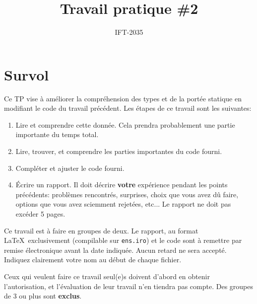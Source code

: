 \documentclass{article}
\title{Travail pratique \#2}
\author{IFT-2035}
\begin{document}
\maketitle

\newcommand \mML {\ensuremath\mu\textsl{ML}}
\newcommand \kw [1] {\textsf{#1}}
\newcommand \id [1] {\textsl{#1}}
\newcommand \punc [1] {\kw{`#1'}}
\newcommand \str [1] {\texttt{"#1"}}
\newenvironment{outitemize}{
  \begin{itemize}
  \let \origitem \item \def \item {\origitem[]\hspace{-18pt}}
}{
  \end{itemize}
}
\newcommand \MAlign [2][t] {\begin{array}[#1]{@{}l} #2 \end{array}}

\section{Survol}

Ce TP vise à améliorer la compréhension des types et de la portée statique
en modifiant le code du travail précédent.  Les étapes de ce
travail sont les suivantes:
\begin{enumerate}
\item Lire et comprendre cette donnée.  Cela prendra probablement une partie
  importante du temps total.
\item Lire, trouver, et comprendre les parties importantes du code fourni.
\item Compléter et ajuster le code fourni.
\item Écrire un rapport.  Il doit décrire \textbf{votre} expérience pendant
  les points précédents: problèmes rencontrés, surprises, choix que vous
  avez dû faire, options que vous avez sciemment rejetées, etc...  Le
  rapport ne doit pas excéder 5 pages.
\end{enumerate}

Ce travail est à faire en groupes de deux.  Le rapport, au format
\LaTeX\ exclusivement (compilable sur \texttt{ens.iro}) et le code sont
à remettre par remise électronique avant la date indiquée.  Aucun retard ne
sera accepté.  Indiquez clairement votre nom au début de chaque fichier.

Ceux qui veulent faire ce travail seul(e)s doivent d'abord en obtenir
l'autorisation, et l'évaluation de leur travail n'en tiendra pas compte.
Des groupes de 3 ou plus sont \textbf{exclus}.
\end{document}
